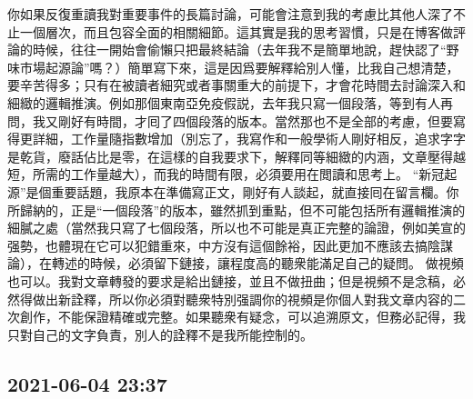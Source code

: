 \documentclass[twocolumn]{ctexart}
\begin{document}
你如果反復重讀我對重要事件的長篇討論，可能會注意到我的考慮比其他人深了不止一個層次，而且包容全面的相關細節。這其實是我的思考習慣，只是在博客做評論的時候，往往一開始會偷懶只把最終結論（去年我不是簡單地說，趕快認了“野味市場起源論”嗎？）簡單寫下來，這是因爲要解釋給別人懂，比我自己想清楚，要辛苦得多；只有在被讀者細究或者事關重大的前提下，才會花時間去討論深入和細緻的邏輯推演。例如那個東南亞免疫假説，去年我只寫一個段落，等到有人再問，我又剛好有時間，才囘了四個段落的版本。當然那也不是全部的考慮，但要寫得更詳細，工作量隨指數增加（別忘了，我寫作和一般學術人剛好相反，追求字字是乾貨，廢話佔比是零，在這樣的自我要求下，解釋同等細緻的内涵，文章壓得越短，所需的工作量越大），而我的時間有限，必須要用在閲讀和思考上。
“新冠起源”是個重要話題，我原本在準備寫正文，剛好有人談起，就直接囘在留言欄。你所歸納的，正是“一個段落”的版本，雖然抓到重點，但不可能包括所有邏輯推演的細膩之處（當然我只寫了七個段落，所以也不可能是真正完整的論證，例如美宣的强勢，也體現在它可以犯錯重來，中方沒有這個餘裕，因此更加不應該去搞陰謀論），在轉述的時候，必須留下鏈接，讓程度高的聽衆能滿足自己的疑問。
做視頻也可以。我對文章轉發的要求是給出鏈接，並且不做扭曲；但是視頻不是念稿，必然得做出新詮釋，所以你必須對聽衆特別强調你的視頻是你個人對我文章内容的二次創作，不能保證精確或完整。如果聽衆有疑念，可以追溯原文，但務必記得，我只對自己的文字負責，別人的詮釋不是我所能控制的。
\subsection*{2021-06-04 23:37}
\end{document}
